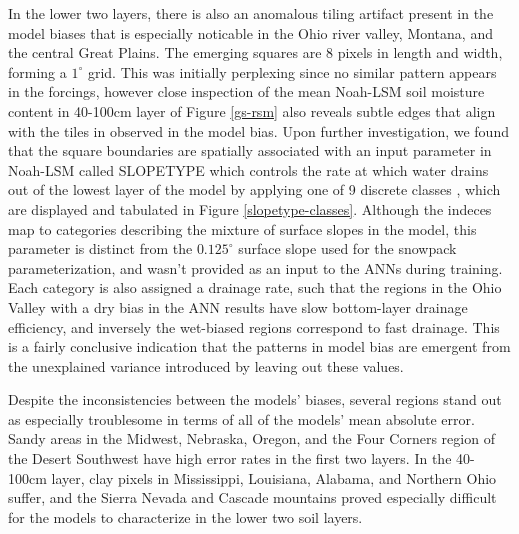 In the lower two layers, there is also an anomalous tiling artifact present in the model biases that is especially noticable in the Ohio river valley, Montana, and the central Great Plains. The emerging squares are 8 pixels in length and width, forming a $1^\circ$ grid. This was initially perplexing since no similar pattern appears in the forcings, however close inspection of the mean Noah-LSM soil moisture content in 40-100cm layer of Figure \ref{gs-rsm} also reveals subtle edges that align with the tiles in observed in the model bias. Upon further investigation, we found that the square boundaries are spatially associated with an input parameter in Noah-LSM called SLOPETYPE which controls the rate at which water drains out of the lowest layer of the model by applying one of 9 discrete classes \citep{mitchell_community_2005}, which are displayed and tabulated in Figure \ref{slopetype-classes}. Although the indeces map to categories describing the mixture of surface slopes in the model, this parameter is distinct from the $0.125^\circ$ surface slope used for the snowpack parameterization, and wasn't provided as an input to the ANNs during training. Each category is also assigned a drainage rate, such that the regions in the Ohio Valley with a dry bias in the ANN results have slow bottom-layer drainage efficiency, and inversely the wet-biased regions correspond to fast drainage. This is a fairly conclusive indication that the patterns in model bias are emergent from the unexplained variance introduced by leaving out these values.

Despite the inconsistencies between the models' biases, several regions stand out as especially troublesome in terms of all of the models' mean absolute error. Sandy areas in the Midwest, Nebraska, Oregon, and the Four Corners region of the Desert Southwest have high error rates in the first two layers. In the 40-100cm layer, clay pixels in Mississippi, Louisiana, Alabama, and Northern Ohio suffer, and the Sierra Nevada and Cascade mountains proved especially difficult for the models to characterize in the lower two soil layers.

%
%

